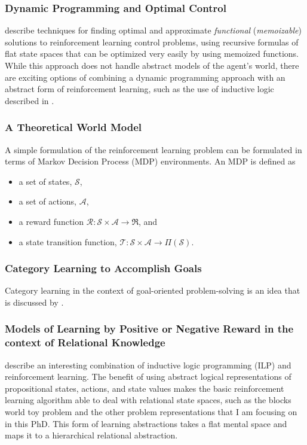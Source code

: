 \subsubsection{Dynamic Programming and Optimal Control}

\cite{bertsekas:1995} describe techniques for finding optimal and approximate \emph{functional} (\emph{memoizable}) solutions to reinforcement learning control problems, using recursive formulas of flat state spaces that can be optimized very easily by using memoized functions.
While this approach does not handle abstract models of the agent's world, there are exciting options of combining a dynamic programming approach with an abstract form of reinforcement learning, such as the use of inductive logic described in \cite{dvzeroski:2001}.

\subsubsection{A Theoretical World Model}

A simple formulation of the reinforcement learning problem can be formulated in terms of Markov Decision Process (MDP) environments.
An MDP is defined as

\begin{itemize}
\item{a set of states, $\mathcal{S}$,}
\item{a set of actions, $\mathcal{A}$,}
\item{a reward function $\mathcal{R}:\mathcal{S}\times\mathcal{A}\rightarrow\Re$, and}
\item{a state transition function, $\mathcal{T}:\mathcal{S}\times\mathcal{A}\rightarrow\Pi{(\mathcal{S})}$.}
\end{itemize}

\subsubsection{Category Learning to Accomplish Goals}

Category learning in the context of goal-oriented problem-solving is an idea that is discussed by \cite{barsalou:1995}.

\subsubsection{Models of Learning by Positive or Negative Reward in the context of Relational Knowledge}

\cite{dvzeroski:2001} describe an interesting combination of inductive logic programming (ILP) \cite[]{muggleton:1992} and reinforcement learning.
The benefit of using abstract logical representations of propositional states, actions, and state values makes the basic reinforcement learning algorithm able to deal with relational state spaces, such as the blocks world toy problem and the other problem representations that I am focusing on in this PhD.
This form of learning abstractions takes a flat mental space and maps it to a hierarchical relational abstraction.

